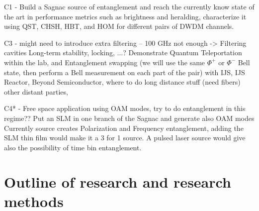 \documentclass{article}
\theoremstyle{mytheoremstyle}
\theoremstyle{mytheoremstyle}
\theoremstyle{myproblemstyle}
\begin{document}
C1 - Build a Sagnac source of entanglement and reach the currently know state of the art in performance metrics such as brightness and heralding,
characterize it using QST, CHSH, HBT, and HOM for different pairs of DWDM channels.


C3 - might need to introduce extra filtering -- 100 GHz not enough -> Filtering cavities
Long-term stability, locking, ...? Demonstrate Quantum Teleportation within the lab, and Entanglement swapping (we will use the same $\Phi^+$ or $\Phi^-$ Bell state,
then perform a Bell measurement on each part of the pair) with IJS, IJS Reactor, Beyond Semiconductor, where to do
long distance stuff (need fibers) other distant parties,

C4* - Free space application using OAM modes, try to do entanglement in this regime??
Put an SLM in one branch of the Sagnac and generate also OAM modes
Currently source creates Polarization and Frequency entanglement, adding the SLM thin film would make it a 3 for 1 source. A pulsed laser source would give
also the possibility of time bin entanglement.


\section{Outline of research and research methods}
\end{document}
